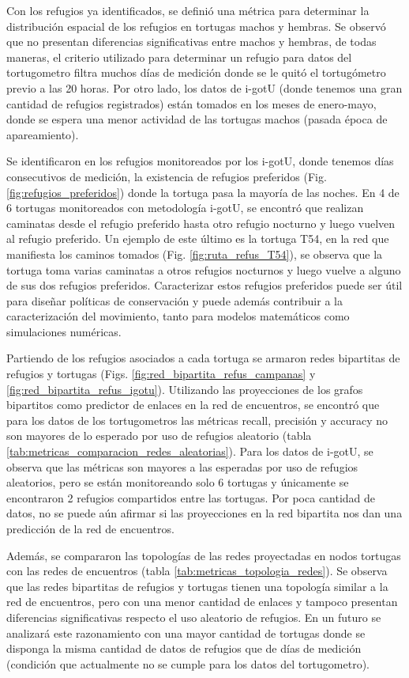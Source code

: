 Con los refugios ya identificados, se definió una métrica para determinar la distribución espacial de los refugios en tortugas machos y hembras. Se observó que no presentan diferencias significativas entre machos y hembras, de todas maneras, el criterio utilizado para determinar un refugio para datos del tortugometro filtra muchos días de medición donde se le quitó el tortugómetro previo a las 20 horas. Por otro lado, los datos de i-gotU (donde tenemos una gran cantidad de refugios registrados) están tomados en los meses de enero-mayo, donde se espera una menor actividad de las tortugas machos (pasada época de apareamiento)\cite{Erika}.
 
Se identificaron en los refugios monitoreados por los i-gotU, donde tenemos días consecutivos de medición, la existencia de refugios preferidos (Fig. \ref{fig:refugios_preferidos}) donde la tortuga pasa la mayoría de las noches. En 4 de 6 tortugas monitoreados con metodología i-gotU, se encontró que realizan caminatas desde el refugio preferido hasta otro refugio nocturno y luego vuelven al refugio preferido. Un ejemplo de este último es la tortuga T54, en la red que manifiesta los caminos tomados (Fig. \ref{fig:ruta_refus_T54}), se observa que la tortuga  toma varias caminatas a otros refugios nocturnos y luego vuelve a alguno de sus dos refugios preferidos. Caracterizar estos refugios preferidos puede ser útil para diseñar políticas de conservación y puede además contribuir a la caracterización del movimiento, tanto para modelos matemáticos como simulaciones numéricas.
 
Partiendo de los refugios asociados a cada tortuga se armaron redes bipartitas de refugios y tortugas (Figs. \ref{fig:red_bipartita_refus_campanas} y \ref{fig:red_bipartita_refus_igotu}). Utilizando las proyecciones de los grafos bipartitos como predictor de enlaces en la red de encuentros, se encontró que para los datos de los tortugometros las métricas recall, precisión y accuracy no son mayores de lo esperado por uso de refugios aleatorio (tabla \ref{tab:metricas_comparacion_redes_aleatorias}). Para los datos de i-gotU, se observa que las métricas son mayores a las esperadas por uso de refugios aleatorios, pero se están monitoreando solo 6 tortugas y únicamente se encontraron 2 refugios compartidos entre las tortugas. Por poca cantidad de datos, no se puede aún afirmar si las proyecciones en la red bipartita nos dan una predicción de la red de encuentros.
 
Además, se compararon las topologías de las redes proyectadas en nodos tortugas con las redes de encuentros (tabla \ref{tab:metricas_topologia_redes}). Se observa que las redes bipartitas de refugios y tortugas tienen una topología similar a la red de encuentros, pero con una menor cantidad de enlaces y tampoco presentan diferencias significativas respecto el uso aleatorio de refugios.  En un futuro se analizará este razonamiento con una mayor cantidad de tortugas donde se disponga la misma cantidad de datos de refugios que de días de medición (condición que actualmente no se cumple para los datos del tortugometro).
 
